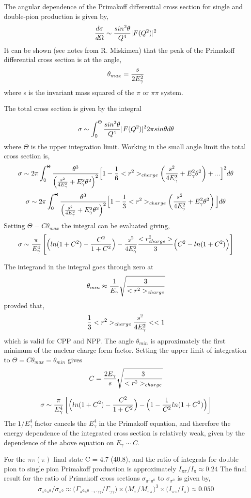 The angular dependence of the Primakoff differential cross section for single and double-pion production is given by,
$$ {d\sigma \over d \Omega} \sim {sin^2 \theta \over Q^4}|F(Q^2)|^2$$
It can be shown (see notes from R. Miskimen) that the peak of the Primakoff differential cross section is at the angle,
$$ \theta_{max}={s \over 2 E^2_\gamma}$$
where s is the invariant mass squared of the $\pi$ or $\pi \pi$ system.   

The total cross section is given by the integral

$$ \sigma \sim \int^\Theta_0 {sin^2 \theta \over Q^4}|F(Q^2)|^2 2 \pi sin \theta d\theta$$
where $\Theta$ is the upper integration limit. Working in the small angle limit the total cross section is,
$$\sigma \sim 2\pi \int^\Theta_0 
{\theta^3 \over \left( {s^2 \over 4E^2_\gamma}+ E^2_\gamma \theta^2  \right)^2} 
\Big[ 1-{1 \over 6}<r^2>_{charge}\left( {s^2 \over 4E^2_\gamma}+ E^2_\gamma \theta^2  \right) +... \Big]^2
d \theta$$
$$\sigma \sim 2\pi \int^\Theta_0 
{\theta^3 \over \left( {s^2 \over 4E^2_\gamma}+ E^2_\gamma \theta^2  \right)^2} 
\Big[ 1-{1 \over 3}<r^2>_{charge}\left( {s^2 \over 4E^2_\gamma}+ E^2_\gamma \theta^2  \right) \Big]
d \theta$$
Setting $\Theta = C\theta_{max}$ the integral can be evaluated giving, 
$$ \sigma \sim {\pi \over E^4_\gamma}
\left[ \Big( ln(1+C^2)-{C^2 \over 1+C^2}  \Big)
- {s^2 \over 4 E^2_\gamma}  { <r^2_{charge}> \over 3} 
\Big(C^2 - ln(1+C^2) \Big) \right]$$

The integrand in the integral goes through zero at
$$\theta_{min} \approx {1 \over E_\gamma}\sqrt{3 \over <r^2>_{charge}}$$
provded that,
$$ {1 \over 3} <r^2>_{charge}{s^2 \over 4 E^2_\gamma} << 1$$
which is valid for CPP and NPP. The angle $\theta_{min}$ is approximately the first minimum of the nuclear charge form factor. 
Setting the upper limit of integration to  $\Theta = C \theta_{max} = \theta_{min}$ gives 
$$C= {2 E_\gamma  \over s}\sqrt{3 \over <r^2>_{charge}}$$

$$ \sigma \sim {\pi \over E^4_\gamma}
\left[ \Big( ln(1+C^2)-{C^2 \over 1+C^2}  \Big)
- 
\Big(1 - {1 \over C^2} ln(1+C^2) \Big) \right]$$
The $1/E^4_\gamma$ factor cancels the $E^4_\gamma$ in the Primakoff equation, and therefore the energy dependence of the integrated cross section is relatively weak, given by the dependence of the above equation on  $E_\gamma \sim C$.  

For the $\pi \pi (\pi)$ final state C = 4.7 (40.8), and the ratio of integrals for double pion to single pion Primakoff production is approximately $I_{\pi\pi} / I_{\pi} \approx 0.24$
The final result for the ratio of Primakoff cross sections $\sigma_{\pi^0 \pi^0}$ to $ \sigma_{\pi^0}$ is given by, 
\begin{eqnarray}
\sigma_{\pi^0 \pi^0}   \Big/ \sigma_{ \pi^0}   
\approx 
\Big(\Gamma_{\pi^0 \pi^0 \rightarrow \gamma \gamma}
\Big/ \Gamma_{\gamma \gamma} \Big)
\times \Big( M_\pi \Big/ 
M_{\pi \pi}\Big)^3\times \Big( I_{\pi \pi} \Big/ I_\pi \Big)
\approx 0.050  \label{eq:sigpipi_over_sigpi}
\end{eqnarray}



